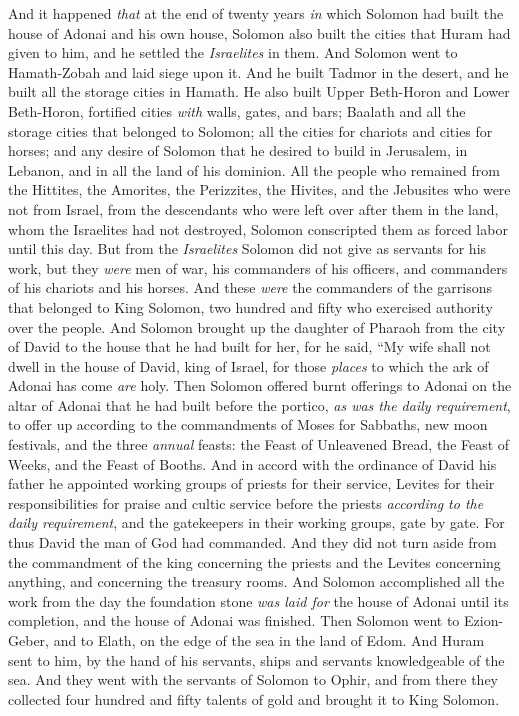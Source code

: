 \begin{biblechapter} %
 And it happened \textit{that} at the end of twenty years \textit{in} which Solomon had built the house of Adonai and his own house,
\verse Solomon also built the cities that Huram had given to him, and he settled the \textit{Israelites} in them.
\verse And Solomon went to Hamath-Zobah and laid siege upon it.
\verse And he built Tadmor in the desert, and he built all the storage cities in Hamath.
\verse He also built Upper Beth-Horon and Lower Beth-Horon, fortified cities \textit{with} walls, gates, and bars;
\verse Baalath and all the storage cities that belonged to Solomon; all the cities for chariots and cities for horses; and any desire of Solomon that he desired to build in Jerusalem, in Lebanon, and in all the land of his dominion.
\verse All the people who remained from the Hittites, the Amorites, the Perizzites, the Hivites, and the Jebusites who were not from Israel,
\verse from the descendants who were left over after them in the land, whom the Israelites had not destroyed, Solomon conscripted them as forced labor until this day.
\verse But from the \textit{Israelites} Solomon did not give as servants for his work, but they \textit{were} men of war, his commanders of his officers, and commanders of his chariots and his horses.
\verse And these \textit{were} the commanders of the garrisons that belonged to King Solomon, two hundred and fifty who exercised authority over the people.
\verse And Solomon brought up the daughter of Pharaoh from the city of David to the house that he had built for her, for he said, “My wife shall not dwell in the house of David, king of Israel, for those \textit{places} to which the ark of Adonai has come \textit{are} holy.
\verse Then Solomon offered burnt offerings to Adonai on the altar of Adonai that he had built before the portico,
\verse \textit{as was the daily requirement}, to offer up according to the commandments of Moses for Sabbaths, new moon festivals, and the three \textit{annual} feasts: the Feast of Unleavened Bread, the Feast of Weeks, and the Feast of Booths.
\verse And in accord with the ordinance of David his father he appointed working groups of priests for their service, Levites for their responsibilities for praise and cultic service before the priests \textit{according to the daily requirement}, and the gatekeepers in their working groups, gate by gate. For thus David the man of God had commanded.
\verse And they did not turn aside from the commandment of the king concerning the priests and the Levites concerning anything, and concerning the treasury rooms.
\verse And Solomon accomplished all the work from the day the foundation stone \textit{was laid for} the house of Adonai until its completion, and the house of Adonai was finished.
\verse Then Solomon went to Ezion-Geber, and to Elath, on the edge of the sea in the land of Edom.
\verse And Huram sent to him, by the hand of his servants, ships and servants knowledgeable of the sea. And they went with the servants of Solomon to Ophir, and from there they collected four hundred and fifty talents of gold and brought it to King Solomon.
\end{biblechapter}

